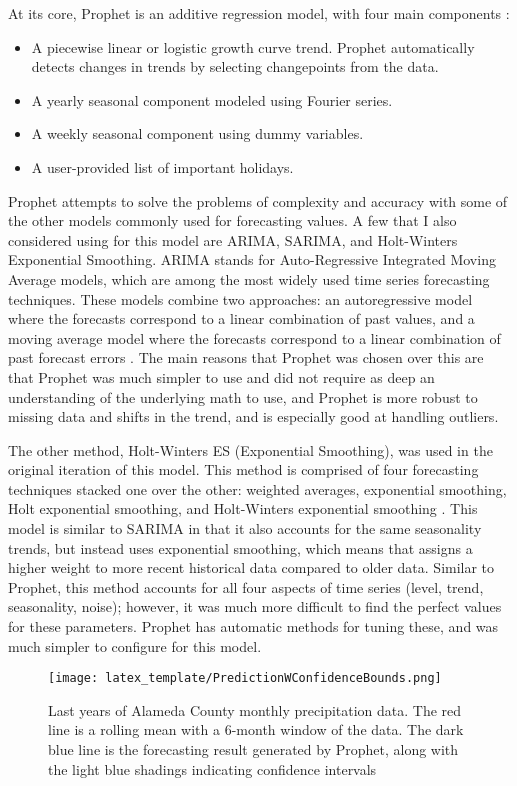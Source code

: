 \documentclass{article}
\begin{document}
At its core, Prophet is an additive regression model, with four main components \cite{prophet}: 
\begin{itemize}
  \item A piecewise linear or logistic growth curve trend. Prophet automatically detects changes in trends by selecting changepoints from the data.
  \item A yearly seasonal component modeled using Fourier series.
  \item A weekly seasonal component using dummy variables.
  \item A user-provided list of important holidays.
\end{itemize}

Prophet attempts to solve the problems of complexity and accuracy with some of the other models commonly used for forecasting values. A few that I also considered using for this model are ARIMA, SARIMA, and Holt-Winters Exponential Smoothing. ARIMA stands for Auto-Regressive Integrated Moving Average models, which are among the most widely used time series forecasting techniques. These models combine two approaches: an autoregressive model where the forecasts correspond to a linear combination of past values, and a moving average model where the forecasts correspond to a linear combination of past forecast errors \cite{arima}. The main reasons that Prophet was chosen over this are that Prophet was much simpler to use and did not require as deep an understanding of the underlying math to use, and Prophet is more robust to missing data and shifts in the trend, and is especially good at handling outliers. 

The other method, Holt-Winters ES (Exponential Smoothing), was used in the original iteration of this model. This method is comprised of four forecasting techniques stacked one over the other: weighted averages, exponential smoothing, Holt exponential smoothing, and Holt-Winters exponential smoothing \cite{holts}. This model is similar to SARIMA in that it also accounts for the same seasonality trends, but instead uses exponential smoothing, which means that assigns a higher weight to more recent historical data compared to older data. Similar to Prophet, this method accounts for all four aspects of time series (level, trend, seasonality, noise); however, it was much more difficult to find the perfect values for these parameters. Prophet has automatic methods for tuning these, and was much simpler to configure for this model. 


\begin{figure}[htp]
    \centering
    \texttt{[image: latex\_template/PredictionWConfidenceBounds.png]}
    \caption{Last years of Alameda County monthly precipitation data. The red line is a rolling mean with a 6-month window of the data. The dark blue line is the forecasting result generated by Prophet, along with the light blue shadings indicating confidence intervals}
    \label{fig:galaxy}
\end{figure}
\end{document}
